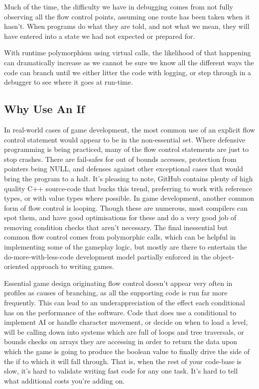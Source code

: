 \documentclass[a4paper,12pt]{book}
\begin{document}
Much of the time, the difficulty we have in debugging comes from not fully observing all the flow control points, assuming one route has been taken when it hasn't.
When programs do what they are told, and not what we mean, they will have entered into a state we had not expected or prepared for.

With runtime polymorphism using virtual calls, the likelihood of that happening can dramatically increase as we cannot be sure we know all the different ways the code can branch until we either litter the code with logging, or step through in a debugger to see where it goes at run-time.

\subsection{Why Use An If}

In real-world cases of game development, the most common use of an explicit flow control statement would appear to be in the non-essential set.
Where defensive programming is being practiced, many of the flow control statements are just to stop crashes.
There are fail-safes for out of bounds accesses, protection from pointers being NULL, and defenses against other exceptional cases that would bring the program to a halt.
It's pleasing to note, GitHub contains plenty of high quality C++ source-code that bucks this trend, preferring to work with reference types, or with value types where possible.
In game development, another common form of flow control is looping.
Though these are numerous, most compilers can spot them, and have good optimisations for these and do a very good job of removing condition checks that aren't necessary.
The final inessential but common flow control comes from polymorphic calls, which can be helpful in implementing some of the gameplay logic, but mostly are there to entertain the do-more-with-less-code development model partially enforced in the object-oriented approach to writing games.

Essential game design originating flow control doesn't appear very often in profiles as causes of branching, as all the supporting code is run far more frequently.
This can lead to an underappreciation of the effect each conditional has on the performance of the software.
Code that does use a conditional to implement AI or handle character movement, or decide on when to load a level, will be calling down into systems which are full of loops and tree traversals, or bounds checks on arrays they are accessing in order to return the data upon which the game is going to produce the boolean value to finally drive the side of the if to which it will fall through.
That is, when the rest of your code-base is slow, it's hard to validate writing fast code for any one task.
It's hard to tell what additional costs you're adding on.
\end{document}
